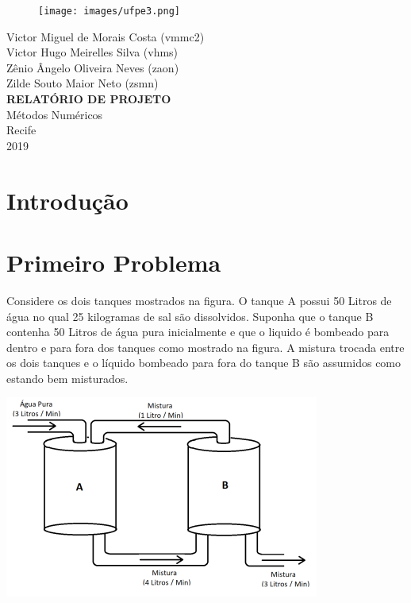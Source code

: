 \documentclass[12pt]{article}%
\newcommand{\newpara}
    {
    \vskip 0.5cm
    }
\begin{document}
\begin{titlepage}
\begin{figure}[t]
\centering
\texttt{[image: images/ufpe3.png]}
\label{fig_ufpe}
\end{figure}
\begin{center} 
{\large Victor Miguel de Morais Costa (vmmc2)}\\[0.2cm]
{\large Victor Hugo Meirelles Silva (vhms)}\\[0.2cm]
{\large Zênio Ângelo Oliveira Neves (zaon)}\\[0.2cm]
{\large Zilde Souto Maior Neto (zsmn)}\\[5.5cm]
{\bf \Large RELATÓRIO DE PROJETO}\\[0.2cm]
{\large Métodos Numéricos}\\[5.5cm]
{\large Recife}\\[0.1cm]
{\large 2019}
\end{center}
\end{titlepage}

\thispagestyle{empty}
\pagebreak
\thispagestyle{empty}
\tableofcontents
\newpage    
\setcounter{page}{1}

\section{Introdução}

\newpage
\section{Primeiro Problema}
    Considere os dois tanques mostrados na figura. O tanque A possui 50 Litros de água no qual 25
    kilogramas de sal são dissolvidos. Suponha que o tanque B contenha 50 Litros de água pura inicialmente
    e que o liquido é bombeado para dentro e para fora dos tanques como mostrado na figura. A mistura
    trocada entre os dois tanques e o líquido bombeado para fora do tanque B são assumidos como estando
    bem misturados.
    \newpara
    \begin{center}
        \includegraphics[scale=1.0]{problemas/p1.png}
    \end{center}
    
\end{document}

